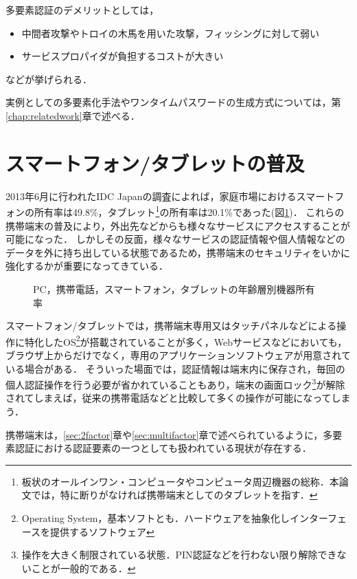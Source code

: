 多要素認証のデメリットとしては，
\begin{itemize}
\item 中間者攻撃やトロイの木馬を用いた攻撃，フィッシングに対して弱い
\item サービスプロパイダが負担するコストが大きい
\end{itemize}
などが挙げられる．

実例としての多要素化手法やワンタイムパスワードの生成方式については，第\ref{chap:relatedwork}章で述べる．

\section{スマートフォン/タブレットの普及}
2013年6月に行われたIDC Japanの調査\cite{idcsmartphone}によれば，家庭市場におけるスマートフォンの所有率は49.8\%，タブレット\footnote{板状のオールインワン・コンピュータやコンピュータ周辺機器の総称．本論文では，特に断りがなければ携帯端末としてのタブレットを指す．}の所有率は20.1\%であった(図\ref{fig:smartphoneUsage})．
これらの携帯端末の普及により，外出先などからも様々なサービスにアクセスすることが可能になった．
しかしその反面，様々なサービスの認証情報や個人情報などのデータを外に持ち出している状態であるため，携帯端末のセキュリティをいかに強化するかが重要になってきている．

\begin{figure}[th]
\begin{center}
\end{center}
\caption{PC，携帯電話，スマートフォン，タブレットの年齢層別機器所有率}
\label{fig:smartphoneUsage}
\end{figure}

スマートフォン/タブレットでは，携帯端末専用又はタッチパネルなどによる操作に特化したOS\footnote{Operating System，基本ソフトとも．ハードウェアを抽象化しインターフェースを提供するソフトウェア}が搭載されていることが多く，Webサービスなどにおいても，ブラウザ上からだけでなく，専用のアプリケーションソフトウェアが用意されている場合がある．
そういった場面では，認証情報は端末内に保存され，毎回の個人認証操作を行う必要が省かれていることもあり，端末の画面ロック\footnote{操作を大きく制限されている状態．PIN認証などを行わない限り解除できないことが一般的である．}が解除されてしまえば，従来の携帯電話などと比較して多くの操作が可能になってしまう．

携帯端末は，\ref{sec:2factor}章や\ref{sec:multifactor}章で述べられているように，多要素認証における認証要素の一つとしても扱われている現状が存在する．

